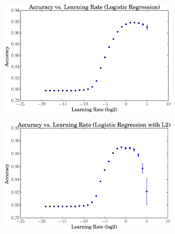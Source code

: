 \documentclass[a4paper, 12pt]{article}
\begin{document}
\begin{figure}[htpb]
\begin{subfigure}[htpb]{0.45\textwidth}
        \includegraphics[width=\textwidth]{acc_vs_rate_logreg}
        \caption{}
        \label{fig:gwd}
    \end{subfigure}
    \begin{subfigure}[htpb]{0.45\textwidth}
        \includegraphics[width=\textwidth]{acc_vs_rate_logregL2}
        \caption{}
        \label{fig:bwd}
    \end{subfigure}
    \caption{}\label{fig:viz}
\end{figure}
\end{document}
